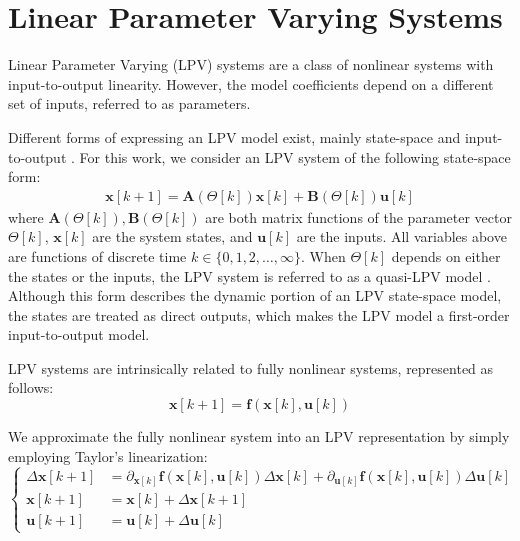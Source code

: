 \section{Linear Parameter Varying Systems} \label{sec:lpv}

Linear Parameter Varying (LPV) systems are a class of nonlinear systems with input-to-output linearity. However, the model coefficients depend on a different set of inputs, referred to as parameters.

Different forms of expressing an LPV model exist, mainly state-space and input-to-output \cite{lpvs}.
%
For this work, we consider an LPV system of the following state-space form:
    \begin{align} \label{eqn:lpvs}
    \mathbf{x}[k+1] = \mathbf{A}(\Theta[k])\mathbf{x}[k] + \mathbf{B}(\Theta[k])\mathbf{u}[k]
    \end{align}
where $\mathbf{A}(\Theta[k]), \mathbf{B}(\Theta[k])$ are both matrix functions of the parameter vector $\Theta[k]$, $\mathbf{x}[k]$ are the system states, and $\mathbf{u}[k]$ are the inputs.
%
All variables above are functions of discrete time $k \in \{0,1,2,\hdots,\infty\}$.
%
When $\Theta[k]$ depends on either the states or the inputs, the LPV system is referred to as a quasi-LPV model \cite{cisneros2018}.
%
Although this form describes the dynamic portion of an LPV state-space model, the states are treated as direct outputs, which makes the LPV model a first-order input-to-output model.

LPV systems are intrinsically related to fully nonlinear systems, represented as follows:
\begin{equation}
    \mathbf{x}[k+1] = \mathbf{f}(\mathbf{x}[k],\mathbf{u}[k])
\end{equation}

We approximate the fully nonlinear system into an LPV representation \cite{lpvs_incremental} by simply employing Taylor's linearization:
\begin{equation}
\left \{
\begin{aligned} \label{eqn:incremental_model}
    \Delta \mathbf{x}[k+1] &= \partial_{\mathbf{x}[k]}\mathbf{f}(\mathbf{x}[k],\mathbf{u}[k])\Delta\mathbf{x}[k] + \partial_{\mathbf{u}[k]}\mathbf{f}(\mathbf{x}[k],\mathbf{u}[k])\Delta \mathbf{u}[k]\\
    \mathbf{x}[k+1] &= \mathbf{x}[k] + \Delta \mathbf{x}[k+1]\\
    \mathbf{u}[k+1] &= \mathbf{u}[k] + \Delta \mathbf{u}[k]
    \end{aligned}
    \right .
\end{equation}


